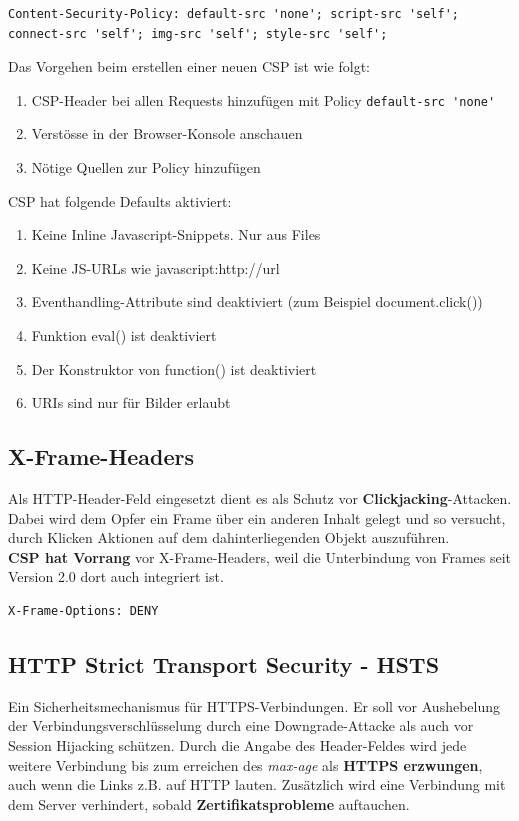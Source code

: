 \begin{lstlisting}[caption=Starter Policy für CSP-Header, language={}]
Content-Security-Policy: default-src 'none'; script-src 'self'; connect-src 'self'; img-src 'self'; style-src 'self';
\end{lstlisting}

Das Vorgehen beim erstellen einer neuen CSP ist wie folgt:
\begin{enumerate}
	\item CSP-Header bei allen Requests hinzufügen mit Policy \lstinline[language=clean]|default-src 'none'|
	\item Verstösse in der Browser-Konsole anschauen
	\item Nötige Quellen zur Policy hinzufügen
\end{enumerate}

CSP hat folgende Defaults aktiviert:
\begin{enumerate}
	\item Keine Inline Javascript-Snippets. Nur aus Files 
	\item Keine JS-URLs wie javascript:http://url
	\item Eventhandling-Attribute sind deaktiviert (zum Beispiel document.click())
	\item Funktion eval() ist deaktiviert
	\item Der Konstruktor von function() ist deaktiviert
	\item URIs sind nur für Bilder erlaubt
\end{enumerate}

\subsection{X-Frame-Headers}
Als HTTP-Header-Feld eingesetzt dient es als Schutz vor \textbf{Clickjacking}-Attacken. Dabei wird dem Opfer ein Frame über ein anderen Inhalt gelegt und so versucht, durch Klicken Aktionen auf dem dahinterliegenden Objekt auszuführen.\\
\textbf{CSP hat Vorrang} vor X-Frame-Headers, weil die Unterbindung von Frames seit Version 2.0 dort auch integriert ist.

\begin{lstlisting}[caption=Clickjacking mittels X-Frame-Options unterbinden, language={}]
X-Frame-Options: DENY
\end{lstlisting}

\subsection{HTTP Strict Transport Security - HSTS}
Ein Sicherheitsmechanismus für HTTPS-Verbindungen. Er soll vor Aushebelung der Verbindungsverschlüsselung durch eine Downgrade-Attacke als auch vor Session Hijacking schützen. Durch die Angabe des Header-Feldes wird jede weitere Verbindung bis zum erreichen des \textit{max-age} als \textbf{HTTPS erzwungen}, auch wenn die Links z.B. auf HTTP lauten. Zusätzlich wird eine Verbindung mit dem Server verhindert, sobald \textbf{Zertifikatsprobleme} auftauchen.\\

